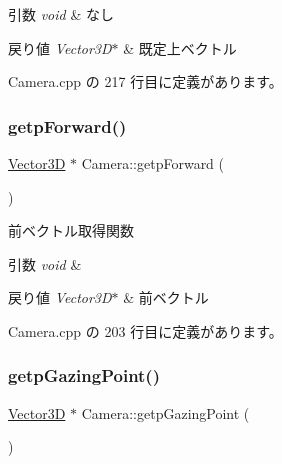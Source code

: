 \begin{DoxyParams}{引数}
{\em void} & なし \\
\hline
\end{DoxyParams}

\begin{DoxyRetVals}{戻り値}
{\em Vector3\+D$\ast$} & 既定上ベクトル \\
\hline
\end{DoxyRetVals}


 Camera.\+cpp の 217 行目に定義があります。

\mbox{\label{class_camera_acef9b42caead07f003dc3f98c0ccdc3c}} 
\subsubsection{\texorpdfstring{getp\+Forward()}{getpForward()}}
{\footnotesize\ttfamily \mbox{\hyperlink{class_vector3_d}{Vector3D}} $\ast$ Camera\+::getp\+Forward (\begin{DoxyParamCaption}{ }\end{DoxyParamCaption})}



前ベクトル取得関数 


\begin{DoxyParams}{引数}
{\em void} & \\
\hline
\end{DoxyParams}

\begin{DoxyRetVals}{戻り値}
{\em Vector3\+D$\ast$} & 前ベクトル \\
\hline
\end{DoxyRetVals}


 Camera.\+cpp の 203 行目に定義があります。

\mbox{\label{class_camera_a26d0234a29c2617960b3d07c1064f8d0}} 
\subsubsection{\texorpdfstring{getp\+Gazing\+Point()}{getpGazingPoint()}}
{\footnotesize\ttfamily \mbox{\hyperlink{class_vector3_d}{Vector3D}} $\ast$ Camera\+::getp\+Gazing\+Point (\begin{DoxyParamCaption}{ }\end{DoxyParamCaption})}



